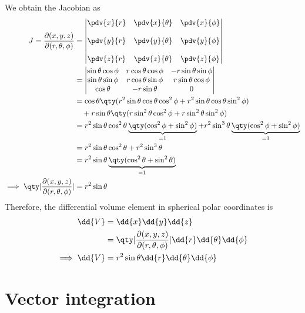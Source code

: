 		We obtain the Jacobian as
		\begin{align*}
			J=\dfrac{\partial(x,y,z)}{\partial(r,\theta,\phi)}&=\begin{vmatrix}
				{\pdv{x}{r}} & {\pdv{x}{\theta}} & {\pdv{x}{\phi}} \\
				{} & {} & {} \\
				{\pdv{y}{r}} & {\pdv{y}{\theta}} & {\pdv{y}{\phi}} \\
				{} & {} & {} \\
				{\pdv{z}{r}} & {\pdv{z}{\theta}} & {\pdv{z}{\phi}}
			\end{vmatrix} \\
				&=\begin{vmatrix}
					{\sin{\theta}\cos{\phi}} & {r\cos{\theta}\cos{\phi}} & {-r\sin{\theta}\sin{\phi}} \\
					{\sin{\theta}\sin{\phi}} & {r\cos{\theta}\sin{\phi}} & {r\sin{\theta}\cos{\phi}} \\
					{\cos{\theta}} & {-r\sin{\theta}} & {0}
				\end{vmatrix} \\
				&=\cos{\theta}\qty(r^2\sin{\theta}\cos{\theta}\cos^2{\phi}+r^2\sin{\theta}\cos{\theta}\sin^2{\phi}) \\
				&\quad+r\sin{\theta}\qty(r\sin^2{\theta}\cos^2{\phi}+r\sin^2{\theta}\sin^2{\phi}) \\
				&=r^2\sin{\theta}\cos^2{\theta}\underbrace{\qty(\cos^2{\phi}+\sin^2{\phi})}_{=1}+r^2\sin^3{\theta}\underbrace{\qty(\cos^2{\phi}+\sin^2{\phi})}_{=1} \\
				&=r^2\sin{\theta}\cos^2{\theta}+r^2\sin^3{\theta} \\
				&=r^2\sin{\theta}\underbrace{\qty(\cos^2{\theta}+\sin^2{\theta})}_{=1} \\
			\implies\qty|\dfrac{\partial(x,y,z)}{\partial(r,\theta,\phi)}|&=r^2\sin{\theta}
		\end{align*}
		Therefore, the differential volume element in spherical polar coordinates is
		\begin{align*}
			\dd{V}&=\dd{x}\dd{y}\dd{z} \\
				&=\qty|\dfrac{\partial(x,y,z)}{\partial(r,\theta,\phi)}|\dd{r}\dd{\theta}\dd{\phi} \\
			\implies\dd{V}&=r^2\sin{\theta}\dd{r}\dd{\theta}\dd{\phi}
		\end{align*}
	
\newpage
\section{Vector integration}

